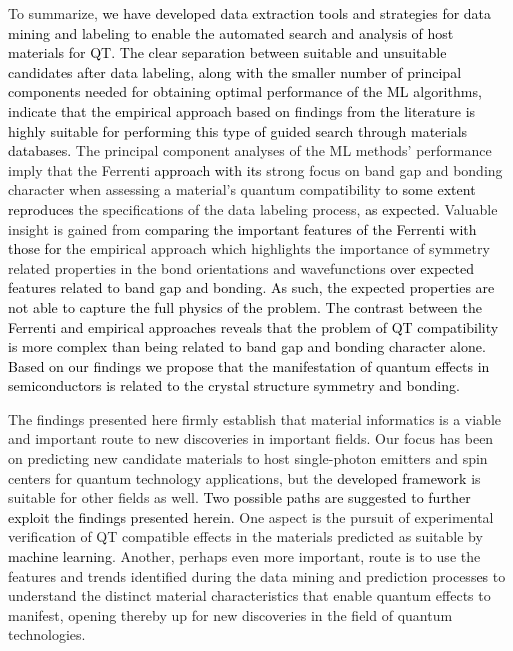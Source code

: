 \documentclass[superscriptaddress,unsortedaddress,
 amsmath,amssymb,
 aps,
]{revtex4-2}
\newcommand{\mrk}[1]{\textcolor{black}{#1}}
\begin{document}
To summarize, \mrk{we have developed data extraction tools and strategies for data mining and labeling to enable the automated search and analysis of host materials for QT.} 
\mrk{The clear separation between suitable and unsuitable candidates after data labeling, along with the smaller number of principal components needed for obtaining optimal performance of the ML algorithms, indicate that the empirical approach based on findings from the literature is highly suitable for performing this type of guided search through materials databases.} 
The principal component analyses of the ML methods' performance imply that the Ferrenti \mrk{approach with its} strong focus on band gap and bonding character when assessing a material's quantum compatibility \mrk{to some extent reproduces} the specifications of the data labeling process, \mrk{as expected.} 
Valuable insight is gained from \mrk{comparing the important features of the Ferrenti with those for} the empirical approach which highlights the importance of symmetry related properties in the bond orientations and wavefunctions \mrk{over expected features related to band gap and bonding}. \mrk{As such, the expected properties are not able to capture the full physics of the problem. The contrast between the Ferrenti and empirical approaches reveals that the problem of QT compatibility is more complex than being related to band gap and bonding character alone. Based on our findings we propose that the manifestation of quantum effects in semiconductors is related to the crystal structure symmetry and bonding. }


The findings presented here firmly establish that material informatics is a viable and important route to new discoveries in important fields. 
Our focus has been on predicting new candidate materials to host single-photon emitters and spin centers for quantum technology applications, but the \mrk{developed framework} is suitable for other fields as well. \mrk{Two possible paths are suggested to further exploit the findings presented herein.} One aspect is the pursuit of experimental verification of QT compatible effects in the materials predicted as suitable by \mrk{machine learning}. Another, perhaps even more important, route is to use the features and trends identified during the data mining and prediction process\mrk{es} to understand the distinct material characteristics that enable quantum effects to manifest, opening  thereby up for new discoveries in the field of quantum technologies. 
\end{document}
